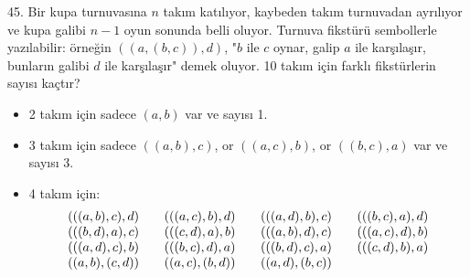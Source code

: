 \begin{problem}{45.}
	Bir kupa turnuvasına $n$ takım katılıyor, kaybeden takım tur\-nu\-va\-dan ayrılıyor ve kupa galibi $n-1$ oyun sonunda belli oluyor. 
	Turnuva fikstürü sembollerle  yazılabilir: örneğin $((a,(b,c)),d)$,  "$b$ ile $c$ oynar, galip $a$ ile karşılaşır, bunların galibi $d$ ile karşılaşır" demek oluyor.
	10 takım için farklı fikstürlerin sayısı kaçtır?
	\begin{itemize}
		\item 2 takım için sadece $(a,b)$ var ve sayısı 1.
		\item 3 takım için sadece $((a,b),c)$, or $((a,c),b)$, or $((b,c),a)$ var ve sayısı 3.
		\item 4 takım için:
			\begin{equation*}
				\begin{array}{@{}cccc@{}}
					(((a,b),c),d) & \quad\;(((a,c),b),d) & \quad\;(((a,d),b),c) & \quad\;(((b,c),a),d) \\
					(((b,d),a),c) & \quad\;(((c,d),a),b) & \quad\;(((a,b),d),c) & \quad\;(((a,c),d),b) \\
					(((a,d),c),b) & \quad\;(((b,c),d),a) & \quad\;(((b,d),c),a) & \quad\;(((c,d),b),a) \\
					((a,b),(c,d)) & \quad\;((a,c),(b,d)) & \quad\;((a,d),(b,c))
				\end{array}
			\end{equation*}
	\end{itemize}
\end{problem}

